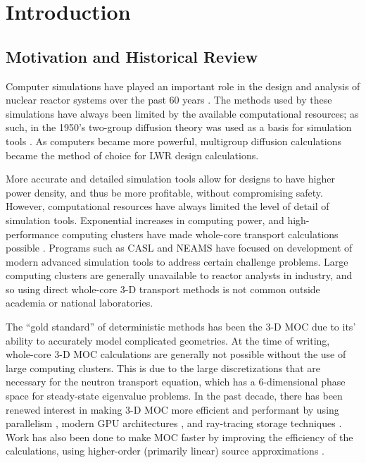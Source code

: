 \chapter{Introduction}{\label{ch:Introduction}
  \section{Motivation and Historical Review}{\label{sec:Introduction:Motivation}
    Computer simulations have played an important role in the design and analysis of nuclear reactor systems over the past 60 years \cite{FewGroupDiffusion}.
    The methods used by these simulations have always been limited by the available computational resources; as such, in the 1950's two-group diffusion theory was used as a basis for simulation tools \cite{FewGroupDiffusion}.
    As computers became more powerful, multigroup diffusion calculations became the method of choice for \ac{LWR} design calculations.

    More accurate and detailed simulation tools allow for designs to have higher power density, and thus be more profitable, without compromising safety.
    However, computational resources have always limited the level of detail of simulation tools.
    Exponential increases in computing power, and high-performance computing clusters have made whole-core transport calculations possible \cite{CASMO-4,Apollo2-2010,DeCART,Denovo,Yang2010,Boyd2014,Collins2016,Gunow2018}.
    Programs such as \ac{CASL} and \ac{NEAMS} have focused on development of modern advanced simulation tools to address certain challenge problems.
    Large computing clusters are generally unavailable to reactor analysts in industry, and so using direct whole-core 3-D transport methods is not common outside academia or national laboratories.

    The ``gold standard'' of deterministic methods has been the 3-D \ac{MOC} \cite{Askew1972} due to its' ability to accurately model complicated geometries.
    At the time of writing, whole-core 3-D \ac{MOC} calculations are generally not possible without the use of large computing clusters.
    This is due to the large discretizations that are necessary for the neutron transport equation, which has a 6-dimensional phase space for steady-state eigenvalue problems.
    In the past decade, there has been renewed interest in making 3-D \ac{MOC} more efficient and performant by using parallelism \cite{Kochunas2013}, modern \ac{GPU} architectures \cite{Boyd2014}, and ray-tracing storage techniques \cite{Sciannandrone2016, Gunow2016}.
    Work has also been done to make \ac{MOC} faster by improving the efficiency of the calculations, using higher-order (primarily linear) source approximations \cite{Ferrer2016,Gunow2018}.

}}
